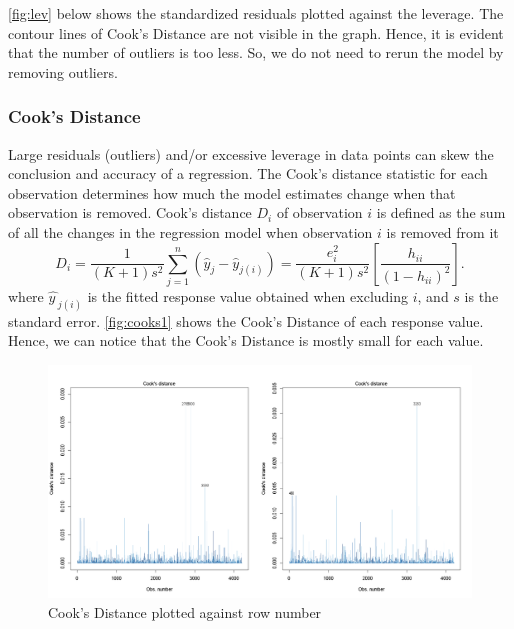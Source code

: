\documentclass[12pt]{article}
\begin{document}
\autoref{fig:lev} below shows the standardized residuals plotted against the leverage. The contour lines of Cook's Distance are not visible in the graph. Hence, it is evident that the number of outliers is too less. So, we do not need to rerun the model by removing outliers.

\subsubsection{Cook's Distance}
Large residuals (outliers) and/or excessive leverage in data points can skew the conclusion and accuracy of a regression.
The Cook's distance statistic for each observation determines how much the model estimates change when that observation is removed.
Cook's distance $D_{i}$ of observation $i$ is defined as the sum of all the changes in the regression model when observation $i$ is removed from it
$$D_{i}={\frac {1}{(K+1)s^{2}} \sum_ {j=1}^{n}(\hat y_j-\hat y_{j(i)})}={\frac {e_{i}^{2}}{(K+1)s^{2}}}\left[{\frac {h_{ii}}{(1-h_{ii})^{2}}}\right].$$
where ${\widehat {y\, }}_{j(i)}$ is the fitted response value obtained when excluding $i$, and $s$ is the standard error.
\autoref{fig:cooks1} shows the Cook's Distance of each response value. Hence, we can notice that the Cook's Distance is mostly small for each value.
\begin{figure}[H]
    \centering
    \includegraphics[width=18cm]{3.3 images/3.3.4.2.png}
    \caption{Cook's Distance plotted against row number}
    \label{fig:cooks1}
\end{figure}
\end{document}
